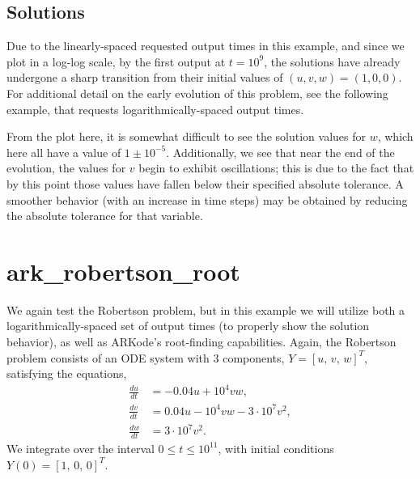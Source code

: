 \documentclass[letterpaper,10pt,english]{sphinxmanual}
\begin{document}
\subsection{Solutions}
\label{\detokenize{c_serial:id14}}
Due to the linearly-spaced requested output times in this example, and
since we plot in a log-log scale, by the first output at
\(t=10^9\), the solutions have already undergone a sharp
transition from their initial values of \((u,v,w) = (1, 0, 0)\).
For additional detail on the early evolution of this problem, see the
following example, that requests logarithmically-spaced output times.

From the plot here, it is somewhat difficult to see the solution
values for \(w\), which here all have a value of
\(1 \pm 10^{-5}\).  Additionally, we see that near the end of the
evolution, the values for \(v\) begin to exhibit oscillations;
this is due to the fact that by this point those values have fallen
below their specified absolute tolerance.  A smoother behavior (with
an increase in time steps) may be obtained by reducing the absolute
tolerance for that variable.

\begin{figure}[htbp]
\centering

\noindent{}
\end{figure}


\section{ark\_robertson\_root}
\label{\detokenize{c_serial:id15}}\label{\detokenize{c_serial:ark-robertson-root}}
We again test the Robertson problem, but in this example we will
utilize both a logarithmically-spaced set of output times (to properly
show the solution behavior), as well as ARKode’s root-finding
capabilities.  Again, the Robertson problem consists of an ODE system
with 3 components, \(Y = [u,\, v,\, w]^T\), satisfying the equations,
\begin{equation*}
\begin{split}\frac{du}{dt} &= -0.04 u + 10^4 v w, \\
\frac{dv}{dt} &= 0.04 u - 10^4 v w - 3\cdot10^7 v^2, \\
\frac{dw}{dt} &= 3\cdot10^7 v^2.\end{split}
\end{equation*}
We integrate over the interval \(0\le t\le 10^{11}\), with initial
conditions  \(Y(0) = [1,\, 0,\, 0]^T\).
\end{document}
